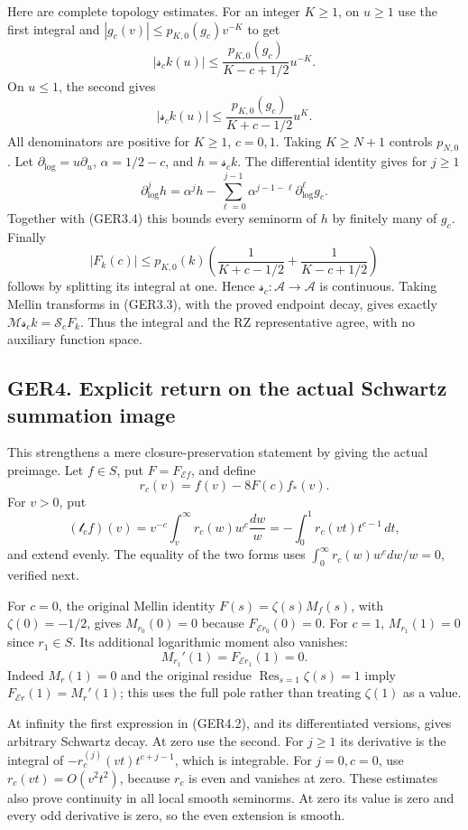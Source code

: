 Here are complete topology estimates. For an integer \(K\ge1\), on
\(u\ge1\) use the first integral and \(|g_c(v)|\le p_{K,0}(g_c)v^{-K}\)
to get \[
|\mathscr s_ck(u)|
\le\frac{p_{K,0}(g_c)}{K-c+1/2}u^{-K}.
\] On \(u\le1\), the second gives \[
|\mathscr s_ck(u)|
\le\frac{p_{K,0}(g_c)}{K+c-1/2}u^K.
\tag{GER3.4}
\] All denominators are positive for \(K\ge1\), \(c=0,1\). Taking
\(K\ge N+1\) controls \(p_{N,0}\). Let \(\partial_{\log}=u\partial_u\),
\(\alpha=1/2-c\), and \(h=\mathscr s_ck\). The differential identity
gives for \(j\ge1\) \[
\partial_{\log}^jh
=\alpha^j h-\sum_{\ell=0}^{j-1}\alpha^{j-1-\ell}
\partial_{\log}^{\ell}g_c.
\tag{GER3.5}
\] Together with (GER3.4) this bounds every seminorm of \(h\) by
finitely many of \(g_c\). Finally \[
|F_k(c)|\le p_{K,0}(k)
\left(\frac1{K+c-1/2}+\frac1{K-c+1/2}\right)
\tag{GER3.6}
\] follows by splitting its integral at one. Hence
\(\mathscr s_c:\mathcal A\to\mathcal A\) is continuous. Taking Mellin
transforms in (GER3.3), with the proved endpoint decay, gives exactly
\(\mathcal M\mathscr s_ck=\mathscr S_cF_k\). Thus the integral and the
RZ representative agree, with no auxiliary function space.

\subsection{GER4. Explicit return on the actual Schwartz summation
image}\label{ger4.-explicit-return-on-the-actual-schwartz-summation-image}

This strengthens a mere closure-preservation statement by giving the
actual preimage. Let \(f\in S\), put \(F=F_{\mathcal Ef}\), and define
\[
r_c(v)=f(v)-8F(c)f_*(v).
\tag{GER4.1}
\] For \(v>0\), put \[
(\mathscr t_cf)(v)=v^{-c}\int_v^\infty r_c(w)w^c\frac{dw}{w}
=-\int_0^1 r_c(vt)t^{c-1}\,dt,
\tag{GER4.2}
\] and extend evenly. The equality of the two forms uses
\(\int_0^\infty r_c(w)w^c dw/w=0\), verified next.

For \(c=0\), the original Mellin identity \(F(s)=\zeta(s)M_f(s)\), with
\(\zeta(0)=-1/2\), gives \(M_{r_0}(0)=0\) because
\(F_{\mathcal Er_0}(0)=0\). For \(c=1\), \(M_{r_1}(1)=0\) since
\(r_1\in S\). Its additional logarithmic moment also vanishes: \[
M_{r_1}'(1)=F_{\mathcal Er_1}(1)=0.
\tag{GER4.3}
\] Indeed \(M_r(1)=0\) and the original residue
\(\operatorname{Res}_{s=1}\zeta(s)=1\) imply
\(F_{\mathcal Er}(1)=M_r'(1)\); this uses the full pole rather than
treating \(\zeta(1)\) as a value.

At infinity the first expression in (GER4.2), and its differentiated
versions, gives arbitrary Schwartz decay. At zero use the second. For
\(j\ge1\) its derivative is the integral of \(-r_c^{(j)}(vt)t^{c+j-1}\),
which is integrable. For \(j=0,c=0\), use \(r_c(vt)=O(v^2t^2)\), because
\(r_c\) is even and vanishes at zero. These estimates also prove
continuity in all local smooth seminorms. At zero its value is zero and
every odd derivative is zero, so the even extension is smooth.

